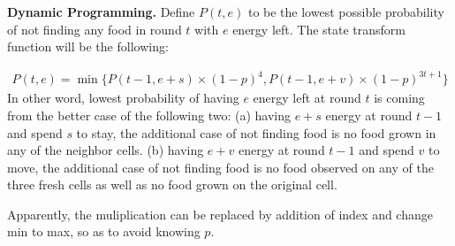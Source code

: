 \textbf{Dynamic Programming.} Define $P(t,e)$ to be the lowest possible 
probability of not finding any food in round $t$ with $e$ energy
left. The state transform function will be the following:

\begin{align*}
P(t,e) = \min\{P(t-1,e+s) \times (1-p)^4, P(t-1, e+v) \times (1-p)^{3t + 1}\}
\end{align*}
In other word, lowest probability of having $e$ energy left at round
$t$ is coming from the better case of the following two: (a) having
$e+s$ energy at round $t-1$ and spend $s$ to stay, the additional case
of not finding food is no food grown in any of the neighbor cells. (b)
having $e+v$ energy at round $t-1$ and spend $v$ to move, the
additional case of not finding food is no food observed on any of the three fresh
cells as well as no food grown on the original cell.

Apparently, the muliplication can be replaced by addition of index and
change min to max, so as to avoid knowing $p$.

